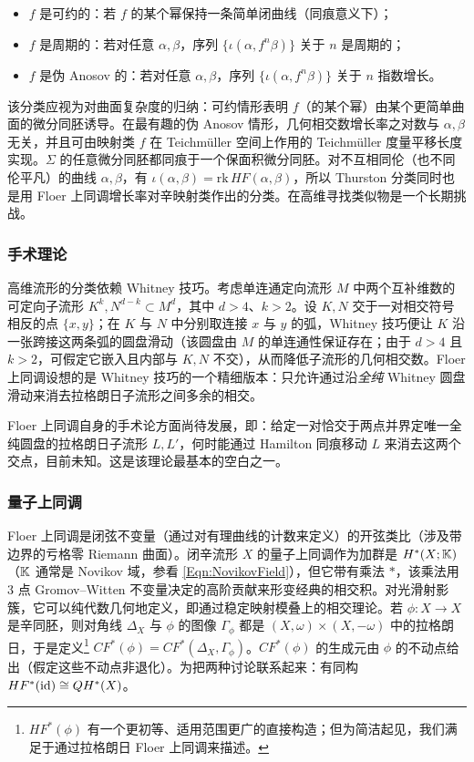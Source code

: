 \begin{itemize}
\item $f$ 是可约的：若 $f$ 的某个幂保持一条简单闭曲线（同痕意义下）；
\item $f$ 是周期的：若对任意 $\alpha, \beta$，序列 $\{\iota(\alpha, f^n\beta)\}$ 关于 $n$ 是周期的；
\item $f$ 是伪 Anosov 的：若对任意 $\alpha,\beta$，序列 $\{\iota(\alpha, f^n\beta)\}$ 关于 $n$ 指数增长。
\end{itemize}

该分类应视为对曲面复杂度的归纳：可约情形表明 $f$（的某个幂）由某个更简单曲面的微分同胚诱导。在最有趣的伪 Anosov 情形，几何相交数增长率之对数与 $\alpha,\beta$ 无关，并且可由映射类 $f$ 在 Teichm\"uller 空间上作用的 Teichm\"uller 度量平移长度实现。$\Sigma$ 的任意微分同胚都同痕于一个保面积微分同胚。对不互相同伦（也不同伦平凡）的曲线 $\alpha, \beta$，有 $\iota(\alpha,\beta) = \mathrm{rk}\, HF(\alpha,\beta)$，所以 Thurston 分类同时也是用 Floer 上同调增长率对辛映射类作出的分类。在高维寻找类似物是一个长期挑战。

\subsubsection{手术理论} 高维流形的分类依赖 Whitney 技巧。考虑单连通定向流形 $M$ 中两个互补维数的可定向子流形 $K^k, N^{d-k} \subset M^d$，其中 $d>4$、$k>2$。设 $K,N$ 交于一对相交符号相反的点 $\{x,y\}$；在 $K$ 与 $N$ 中分别取连接 $x$ 与 $y$ 的弧，Whitney 技巧便让 $K$ 沿一张跨接这两条弧的圆盘滑动（该圆盘由 $M$ 的单连通性保证存在；由于 $d > 4$ 且 $k>2$，可假定它嵌入且内部与 $K,N$ 不交），从而降低子流形的几何相交数。Floer 上同调设想的是 Whitney 技巧的一个精细版本：只允许通过沿\emph{全纯} Whitney 圆盘滑动来消去拉格朗日子流形之间多余的相交。

Floer 上同调自身的手术论方面尚待发展，即：给定一对恰交于两点并界定唯一全纯圆盘的拉格朗日子流形 $L, L'$，何时能通过 Hamilton 同痕移动 $L$ 来消去这两个交点，目前未知。这是该理论最基本的空白之一。

\subsubsection{量子上同调} Floer 上同调是闭弦不变量（通过对有理曲线的计数来定义）的开弦类比（涉及带边界的亏格零 Riemann 曲面）。闭辛流形 $X$ 的量子上同调作为加群是 $H^*(X;\mathbb{K})$（$\mathbb{K}$ 通常是 Novikov 域，参看 \eqref{Eqn:NovikovField}），但它带有乘法 $\ast$，该乘法用 3 点 Gromov–Witten 不变量决定的高阶贡献来形变经典的相交积。对光滑射影簇，它可以纯代数几何地定义，即通过稳定映射模叠上的相交理论。若 $\phi: X\rightarrow X$ 是辛同胚，则对角线 $\Delta_X$ 与 $\phi$ 的图像 $\Gamma_{\phi}$ 都是 $(X,\omega) \times (X,-\omega)$ 中的拉格朗日，于是定义\footnote{$HF^*(\phi)$ 有一个更初等、适用范围更广的直接构造；但为简洁起见，我们满足于通过拉格朗日 Floer 上同调来描述。} $CF^*(\phi) = CF^*(\Delta_X, \Gamma_{\phi})$。$CF^*(\phi)$ 的生成元由 $\phi$ 的不动点给出（假定这些不动点非退化）。为把两种讨论联系起来：有同构 $HF^*(\mathrm{id}) \cong QH^*(X)$。

